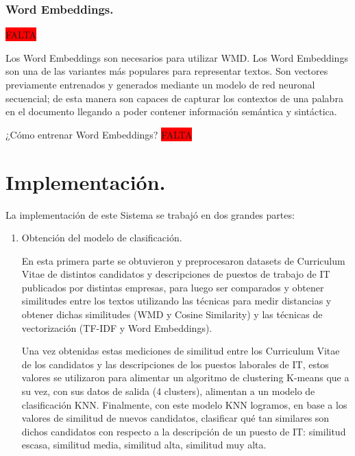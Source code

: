 \documentclass[12pt,a4paper]{article}
\makeatletter
\renewcommand\paragraph{\@startsection{paragraph}{4}{\z@}
            {-2.5ex\@plus -1ex \@minus -.25ex}
            {1.25ex \@plus .25ex}
            {\normalfont\normalsize\bfseries}}
\makeatother
\begin{document}
\begin{sloppypar}
\subsubsection{Word Embeddings.}
\colorbox{red}{FALTA}

Los Word Embeddings son necesarios para utilizar WMD.
Los Word Embeddings son una de las variantes más populares para representar textos.  Son vectores previamente entrenados y generados mediante un modelo de red neuronal secuencial; de esta manera son capaces de capturar los contextos de una palabra en el documento llegando a poder contener información semántica y sintáctica. 

\cleardoublepage

\paragraph{¿Cómo entrenar Word Embeddings?}
\colorbox{red}{FALTA}

\cleardoublepage

\section{Implementación.}\label{5.Implementacion}

La implementación de este Sistema se trabajó en dos grandes partes:
\begin{enumerate}
\item Obtención del modelo de clasificación. 

En esta primera parte se obtuvieron y preprocesaron datasets de Curriculum Vitae de distintos candidatos y descripciones de puestos de trabajo de IT publicados por distintas empresas, para luego ser comparados y obtener similitudes entre los textos utilizando las técnicas para medir distancias y obtener dichas similitudes (WMD y Cosine Similarity) y las técnicas de vectorización (TF-IDF y Word Embeddings).

Una vez obtenidas estas mediciones de similitud entre los Curriculum Vitae de los candidatos y las descripciones de los puestos laborales de IT, estos valores se utilizaron para alimentar un algoritmo de clustering K-means que a su vez, con sus datos de salida (4 clusters), alimentan a un modelo de clasificación KNN. Finalmente, con este modelo KNN logramos, en base a los valores de similitud de nuevos candidatos, clasificar qué tan similares son dichos candidatos con respecto a la descripción de un puesto de IT: similitud escasa, similitud media, similitud alta, similitud muy alta.


\end{enumerate}
\end{sloppypar}
\end{document}
